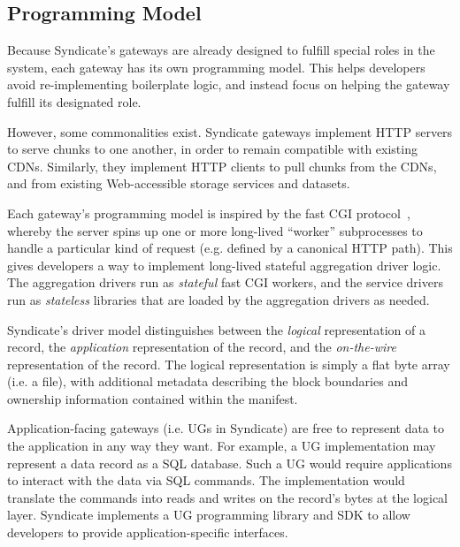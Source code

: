 \subsection{Programming Model}

Because Syndicate's gateways are already designed to fulfill special roles in
the system, each gateway has its own programming model.  This helps developers
avoid re-implementing boilerplate logic, and instead focus on helping the
gateway fulfill its designated role.

However, some commonalities exist.
Syndicate gateways implement HTTP servers to serve chunks to one
another, in order to remain compatible with existing CDNs.  Similarly, they
implement HTTP clients to pull chunks from the CDNs, and from existing
Web-accessible storage services and datasets.

Each gateway's programming model is inspired by the fast CGI protocol~\cite{fastcgi},
whereby the server spins up one or more long-lived ``worker'' subprocesses to
handle a particular kind of request (e.g. defined by a canonical HTTP path).
This gives developers a way to implement long-lived stateful aggregation driver
logic.  The aggregation drivers run as \emph{stateful} fast CGI workers, and
the service drivers run as \emph{stateless} libraries that are loaded by the
aggregation drivers as needed.

Syndicate's driver model distinguishes between the \emph{logical} representation of a record,
the \emph{application} representation of the record, and the 
\emph{on-the-wire} representation of the record.  The logical representation is
simply a flat byte array (i.e. a file), with
additional metadata describing the block boundaries and ownership information
contained within the manifest.

Application-facing gateways (i.e. UGs in Syndicate) are free to represent data 
to the application in any way they want.  For example, a UG implementation
may represent a data record as a
SQL database.  Such a UG would require applications to interact with the data
via SQL commands.  The implementation would translate the commands into
reads and writes on the record's bytes
at the logical layer.  Syndicate implements a UG programming library and
SDK to allow developers to provide application-specific interfaces.

